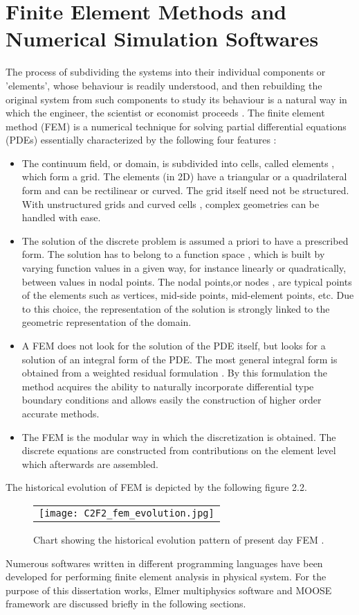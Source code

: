 \section{Finite Element Methods and Numerical Simulation Softwares } 
The process of subdividing the systems into their individual components or 'elements', whose behaviour is readily understood, and then rebuilding the original system from such components to study its behaviour is a natural way in which the engineer, the scientist or economist proceeds \cite{OCzienkiewicz2000}. The finite element method (FEM) is a numerical technique for solving partial differential equations (PDEs) essentially characterized by the following four features \cite{EDick2009}:
\begin{itemize}
\item  The continuum field, or domain, is subdivided into cells, called elements , which form a grid. The elements
(in 2D) have a triangular or a quadrilateral form and can be rectilinear or curved. The grid itself need not be structured. With unstructured grids and curved cells , complex geometries can be handled with ease.
\item The solution of the discrete problem is assumed a priori to have a prescribed form. The solution has to belong to a function space , which is built by varying function values in a given way, for instance linearly or quadratically, between values in nodal points. The nodal points,or nodes , are typical points of the elements such as vertices, mid-side points, mid-element points, etc. Due to this choice, the representation of the solution is strongly linked to the geometric representation of the domain.
\item  A FEM does not look for the solution of the PDE itself, but looks for a solution of an integral form of the PDE. The most
general integral form is obtained from a weighted residual formulation . By this formulation the method acquires the ability to naturally incorporate differential type boundary  conditions
and  allows  easily  the  construction  of  higher  order  accurate methods.
\item  The FEM is the modular way in which the discretization is obtained. The discrete equations are constructed from contributions on the element level which afterwards are
assembled.

\end{itemize}
The historical evolution of FEM is depicted by the following figure 2.2. 
\begin{figure}[h]
\begin{center}
  \begin{tabular}{c}
  \texttt{[image: C2F2\_fem\_evolution.jpg]}
  \end{tabular}
  \caption{Chart showing the historical evolution pattern of present day FEM \cite{OCzienkiewicz2000} .}
\end{center}
\end{figure}
Numerous softwares written in different programming languages have been developed for performing finite element analysis in physical system. For the purpose of this dissertation works, Elmer multiphysics software and MOOSE framework are discussed  briefly in the following sections.
